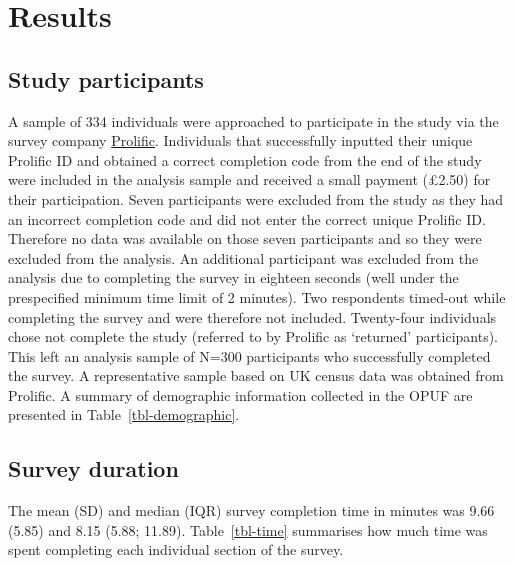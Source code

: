 \documentclass[
  letterpaper,
  DIV=11,
  numbers=noendperiod]{scrartcl}
\begin{document}
\section{Results}\label{results}

\subsection{Study participants}\label{study-participants}

A sample of 334 individuals were approached to participate in the study
via the survey company \href{https://www.prolific.com}{Prolific}.
Individuals that successfully inputted their unique Prolific ID and
obtained a correct completion code from the end of the study were
included in the analysis sample and received a small payment (£2.50) for
their participation. Seven participants were excluded from the study as
they had an incorrect completion code and did not enter the correct
unique Prolific ID. Therefore no data was available on those seven
participants and so they were excluded from the analysis. An additional
participant was excluded from the analysis due to completing the survey
in eighteen seconds (well under the prespecified minimum time limit of 2
minutes). Two respondents timed-out while completing the survey and were
therefore not included. Twenty-four individuals chose not complete the
study (referred to by Prolific as `returned' participants). This left an
analysis sample of N=300 participants who successfully completed the
survey. A representative sample based on UK census data was obtained
from Prolific. A summary of demographic information collected in the
OPUF are presented in Table~\ref{tbl-demographic}.

\subsection{Survey duration}\label{survey-duration}

The mean (SD) and median (IQR) survey completion time in minutes was
9.66 (5.85) and 8.15 (5.88; 11.89). Table~\ref{tbl-time} summarises how
much time was spent completing each individual section of the survey.
\end{document}
